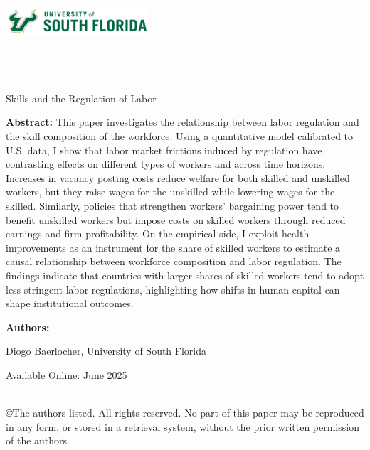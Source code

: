 \documentclass[11pt]{article}
\begin{document}
\onehalfspacing

\noindent \includegraphics[width = 0.4\textwidth]{USouthFlorida-lightbg-2c-rgb-h.png} \\

\noindent{\color{usfgreen} \rule{0.5\textwidth}{10pt}}{\color{usfgold} \rule{0.5\textwidth}{10pt}}\\

 \\
 \\

\vspace*{0.5in}

\begin{center} 
    \huge Skills and the Regulation of Labor
\end{center}

\vspace*{0.5in}

\noindent \textbf{Abstract:} This paper investigates the relationship between labor regulation and the skill composition of the workforce. Using a quantitative model calibrated to U.S. data, I show that labor market frictions induced by regulation have contrasting effects on different types of workers and across time horizons. Increases in vacancy posting costs reduce welfare for both skilled and unskilled workers, but they raise wages for the unskilled while lowering wages for the skilled. Similarly, policies that strengthen workers' bargaining power tend to benefit unskilled workers but impose costs on skilled workers through reduced earnings and firm profitability. On the empirical side, I exploit health improvements as an instrument for the share of skilled workers to estimate a causal relationship between workforce composition and labor regulation. The findings indicate that countries with larger shares of skilled workers tend to adopt less stringent labor regulations, highlighting how shifts in human capital can shape institutional outcomes.

\vspace*{0.25in}

\noindent \textbf{Authors:}

Diogo Baerlocher, University of South Florida 

\vspace*{0.25in}


\noindent Available Online: June 2025 %

\vfill 
\noindent{\color{usfgreen} \rule{\textwidth}{5pt}}\\
\noindent \small ©The authors listed. All rights reserved. No part of this paper may be reproduced in any form, or stored in a retrieval system, without the prior written permission of the authors.
\thispagestyle{empty}
\end{document}
